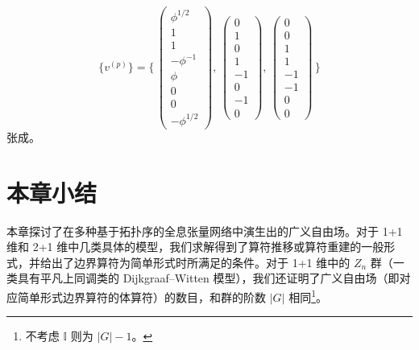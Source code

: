 \begin{equation}
  \{ v^{(p)} \} = \Biggl\{ \,
    \begin{pmatrix} \phi^{1/2} \\ 1 \\ 1 \\ -\phi^{-1} \\ \phi \\ 0 \\ 0 \\ -\phi^{1/2} \end{pmatrix}, \,
    \begin{pmatrix} 0 \\ 1 \\ 0 \\ 1 \\ -1 \\  0 \\ -1 \\ 0 \end{pmatrix}, \,
    \begin{pmatrix} 0 \\ 0 \\ 1 \\ 1 \\ -1 \\ -1 \\  0 \\ 0 \end{pmatrix} \,
  \Biggr\}
\end{equation}
张成。

\section{本章小结}

本章探讨了在多种基于拓扑序的全息张量网络中演生出的广义自由场。对于 1+1 维和 2+1 维中几类具体的模型，我们求解得到了算符推移或算符重建的一般形式，并给出了边界算符为简单形式时所满足的条件。对于 1+1 维中的 $Z_n$ 群（一类具有平凡上同调类的 Dijkgraaf--Witten 模型），我们还证明了广义自由场（即对应简单形式边界算符的体算符）的数目，和群的阶数 $|G|$ 相同\footnote{不考虑 $\mathbb{I}$ 则为 $|G|-1$。}。
